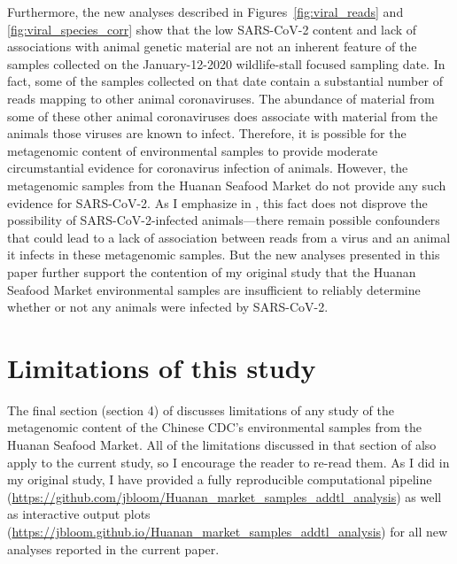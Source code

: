\documentclass[9pt,onecolumn,twoside]{gsajnl_modified}
\begin{document}
Furthermore, the new analyses described in Figures~\ref{fig:viral_reads} and \ref{fig:viral_species_corr} show that the low SARS-CoV-2 content and lack of associations with animal genetic material are not an inherent feature of the samples collected on the January-12-2020 wildlife-stall focused sampling date.
In fact, some of the samples collected on that date contain a substantial number of reads mapping to other animal coronaviruses.
The abundance of material from some of these other animal coronaviruses does associate with material from the animals those viruses are known to infect.
Therefore, it is possible for the metagenomic content of environmental samples to provide moderate circumstantial evidence for coronavirus infection of animals.
However, the metagenomic samples from the Huanan Seafood Market do not provide any such evidence for SARS-CoV-2.
As I emphasize in \citet{bloom2023association}, this fact does not disprove the possibility of SARS-CoV-2-infected animals---there remain possible confounders that could lead to a lack of association between reads from a virus and an animal it infects in these metagenomic samples.
But the new analyses presented in this paper further support the contention of my original study that the Huanan Seafood Market environmental samples are insufficient to reliably determine whether or not any animals were infected by SARS-CoV-2.

\section{Limitations of this study}
The final section (section 4) of \citet{bloom2023association} discusses limitations of any study of the metagenomic content of the Chinese CDC's environmental samples from the Huanan Seafood Market.
All of the limitations discussed in that section of \citet{bloom2023association} also apply to the current study, so I encourage the reader to re-read them.
As I did in my original study, I have provided a fully reproducible computational pipeline (\url{https://github.com/jbloom/Huanan_market_samples_addtl_analysis}) as well as interactive output plots (\url{https://jbloom.github.io/Huanan_market_samples_addtl_analysis}) for all new analyses reported in the current paper.
\end{document}

